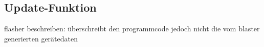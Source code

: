 \subsection{Update-Funktion}

flasher beschreiben: überschreibt den programmcode jedoch nicht die vom blaster generierten gerätedaten